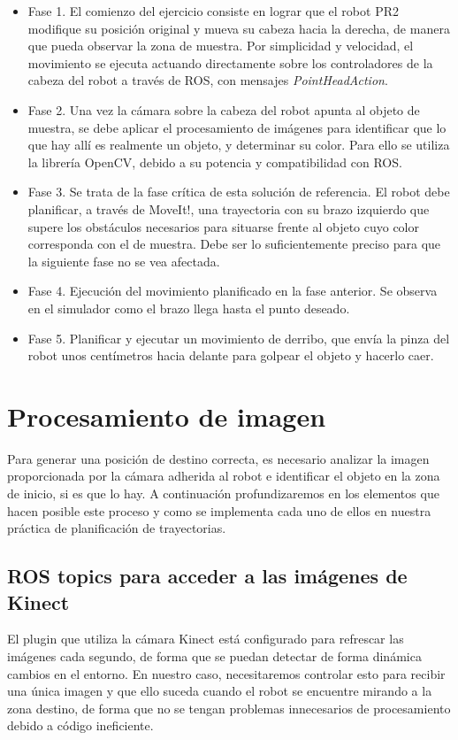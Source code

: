 \documentclass[12pt,spanish,chapterprefix, numbers=noenddot]{book}
\numberwithin{equation}{section}
\numberwithin{figure}{section}
\begin{document}
\begin{itemize}
    \item Fase 1. El comienzo del ejercicio consiste en lograr que el robot PR2 modifique su posición original y mueva su cabeza hacia la derecha, de manera que pueda observar la zona de muestra. Por simplicidad y velocidad, el movimiento se ejecuta actuando directamente sobre los controladores de la cabeza del robot a través de ROS, con mensajes \textit{PointHeadAction}.
    \item Fase 2. Una vez la cámara sobre la cabeza del robot apunta al objeto de muestra, se debe aplicar el procesamiento de imágenes para identificar que lo que hay allí es realmente un objeto, y determinar su color. Para ello se utiliza la librería OpenCV, debido a su potencia y compatibilidad con ROS. 
    \item Fase 3. Se trata de la fase crítica de esta solución de referencia. El robot debe planificar, a través de MoveIt!, una trayectoria con su brazo izquierdo que supere los obstáculos necesarios para situarse frente al objeto cuyo color corresponda con el de muestra. Debe ser lo suficientemente preciso para que la siguiente fase no se vea afectada. 
    \item Fase 4. Ejecución del movimiento planificado en la fase anterior. Se observa en el simulador como el brazo llega hasta el punto deseado. 
    \item Fase 5. Planificar y ejecutar un movimiento de derribo, que envía la pinza del robot unos centímetros hacia delante para golpear el objeto y hacerlo caer. 
\end{itemize}


\section{Procesamiento de imagen}
Para generar una posición de destino correcta, es necesario analizar la imagen proporcionada por la cámara adherida al robot  e identificar el objeto en la zona de inicio, si es que lo hay. 
A continuación profundizaremos en los elementos que hacen posible este proceso y como se implementa cada uno de ellos en nuestra práctica de planificación de trayectorias. 

\subsection{ROS topics para acceder a las imágenes de Kinect} 

El plugin que utiliza la cámara Kinect está configurado para refrescar las imágenes cada segundo, de forma que se puedan detectar de forma dinámica cambios en el entorno.
En nuestro caso, necesitaremos controlar esto para recibir una única imagen y que ello suceda cuando el robot se encuentre mirando a la zona destino, de forma que no se tengan problemas innecesarios de procesamiento debido a código ineficiente.
\end{document}
